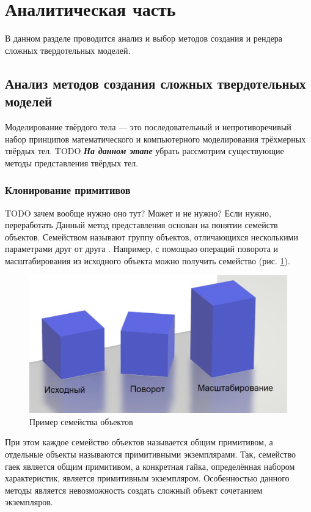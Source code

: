 \section{Аналитическая часть}

В данном разделе проводится анализ и выбор методов создания и рендера 
сложных твердотельных моделей.

\subsection{Анализ методов создания сложных твердотельных моделей}

Моделирование твёрдого тела --- это последовательный и 
непротиворечивый набор принципов математического и компьютерного 
моделирования трёхмерных твёрдых тел. 
TODO \textbf{\textit{На данном этапе}} убрать  рассмотрим 
существующие методы представления твёрдых тел.

\subsubsection{Клонирование примитивов}

TODO зачем вообще нужно оно тут? Может и не нужно? Если нужно, переработать
Данный метод представления основан на понятии семейств объектов. 
Семейством называют группу объектов, отличающихся несколькими 
параметрами друг от друга \cite{cloning}.
Например, с помощью операций поворота и 
масштабирования из исходного объекта можно получить семейство (рис. \ref{fig:primitiveClone}).

\begin{figure}[h]
	\centering
	\includegraphics[width=\textwidth]{img/primitiveClone.png}
	\caption{Пример семейства объектов}
	\label{fig:primitiveClone}
\end{figure}

При этом каждое семейство объектов называется общим примитивом, а 
отдельные объекты называются примитивными экземплярами. 
Так, семейство гаек является общим примитивом, а конкретная гайка, определённая набором характеристик, является примитивным экземпляром.
Особенностью данного методы является невозможность создать сложный 
объект сочетанием экземпляров. 

